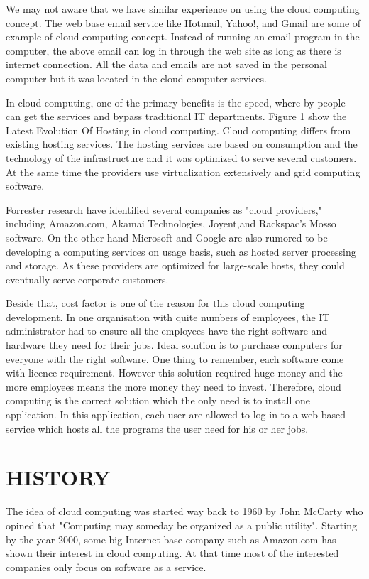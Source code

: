 \documentclass[conference, compsoc]{IEEEtran}
\begin{document}
We may not aware that we have similar experience on using the cloud computing concept. The web base email service like Hotmail, Yahoo!, and Gmail are some of example of cloud computing concept. Instead of running an email program in the computer, the above email can log in through the web site as long as there is internet connection. All the data and emails are not saved in the personal computer but it was located in the cloud computer services.


In cloud computing, one of the primary benefits is the speed, where by people can get the services and bypass traditional IT departments. Figure 1 show the Latest Evolution Of Hosting in cloud computing. Cloud computing differs from existing hosting services. The hosting services are based on consumption and the technology of the infrastructure and it was optimized to serve several customers. At the same time the providers use virtualization extensively and grid computing software.

Forrester research have identified several companies as "cloud providers," including Amazon.com, Akamai Technologies, Joyent,and Rackspac's Mosso software. On the other hand Microsoft and Google are also rumored to be developing a computing services on usage basis, such as hosted server processing and storage. As these providers are optimized for large-scale hosts, they could eventually serve corporate customers.

Beside that, cost factor is one of the reason for this cloud computing development. In one organisation with quite numbers of employees, the IT administrator had to ensure all the employees have the right software and hardware they need for their jobs. Ideal solution is to purchase computers for everyone with the right software. One thing to remember, each software come with licence requirement. However this solution required huge money and the more employees means the more money they need to invest. Therefore, cloud computing is the correct solution which the only need is to install one application. In this application, each user are allowed to log in to a web-based service which hosts all the programs the user need for his or her jobs. 


\section{HISTORY}
The idea of cloud computing was started way back to 1960 by John McCarty who opined that "Computing may someday be organized as a public utility". Starting by the year 2000, some big Internet base company such as Amazon.com has shown their interest in cloud computing. At that time most of the interested companies only focus on software as a service. 
\end{document}
